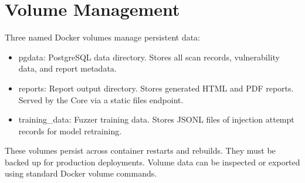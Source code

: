 \section{Volume Management}
Three named Docker volumes manage persistent data:
\begin{itemize}
    \item pgdata: PostgreSQL data directory. Stores all scan records, vulnerability data, and report metadata.
    \item reports: Report output directory. Stores generated HTML and PDF reports. Served by the Core via a static files endpoint.
    \item training\_\allowbreak data: Fuzzer training data. Stores JSONL files of injection attempt records for model retraining.
\end{itemize}
These volumes persist across container restarts and rebuilds. They must be backed up for production deployments. Volume data can be inspected or exported using standard Docker volume commands.